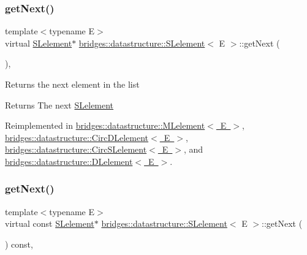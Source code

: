 \subsubsection{\texorpdfstring{get\+Next()}{getNext()}\hspace{0.1cm}{\footnotesize\ttfamily [1/2]}}
{\footnotesize\ttfamily template$<$typename E$>$ \\
virtual \mbox{\hyperlink{classbridges_1_1datastructure_1_1_s_lelement}{S\+Lelement}}$\ast$ \mbox{\hyperlink{classbridges_1_1datastructure_1_1_s_lelement}{bridges\+::datastructure\+::\+S\+Lelement}}$<$ E $>$\+::get\+Next (\begin{DoxyParamCaption}{ }\end{DoxyParamCaption})\hspace{0.3cm}{\ttfamily [inline]}, {\ttfamily [virtual]}}

Returns the next element in the list \begin{DoxyReturn}{Returns}
The next \mbox{\hyperlink{classbridges_1_1datastructure_1_1_s_lelement}{S\+Lelement}} 
\end{DoxyReturn}


Reimplemented in \mbox{\hyperlink{classbridges_1_1datastructure_1_1_m_lelement_a47b417db0b948b6899eece572bef9274}{bridges\+::datastructure\+::\+M\+Lelement$<$ E $>$}}, \mbox{\hyperlink{classbridges_1_1datastructure_1_1_circ_d_lelement_a80681d0382643a6df21da1bec4067004}{bridges\+::datastructure\+::\+Circ\+D\+Lelement$<$ E $>$}}, \mbox{\hyperlink{classbridges_1_1datastructure_1_1_circ_s_lelement_aff77056ace1361a35a09dc006eba34a3}{bridges\+::datastructure\+::\+Circ\+S\+Lelement$<$ E $>$}}, and \mbox{\hyperlink{classbridges_1_1datastructure_1_1_d_lelement_a63212051ea77d74bd751dea00288d2be}{bridges\+::datastructure\+::\+D\+Lelement$<$ E $>$}}.

\mbox{\label{classbridges_1_1datastructure_1_1_s_lelement_a8c62cb82fa64bbfe9ebb7334a5fea417}} 
\subsubsection{\texorpdfstring{get\+Next()}{getNext()}\hspace{0.1cm}{\footnotesize\ttfamily [2/2]}}
{\footnotesize\ttfamily template$<$typename E$>$ \\
virtual const \mbox{\hyperlink{classbridges_1_1datastructure_1_1_s_lelement}{S\+Lelement}}$\ast$ \mbox{\hyperlink{classbridges_1_1datastructure_1_1_s_lelement}{bridges\+::datastructure\+::\+S\+Lelement}}$<$ E $>$\+::get\+Next (\begin{DoxyParamCaption}{ }\end{DoxyParamCaption}) const\hspace{0.3cm}{\ttfamily [inline]}, {\ttfamily [virtual]}}

